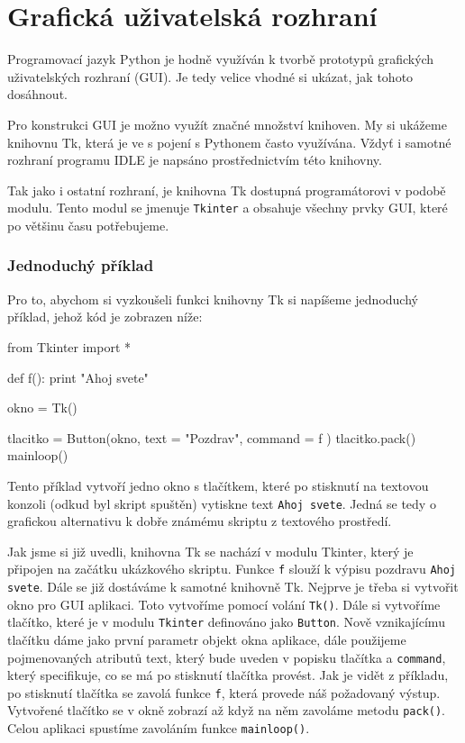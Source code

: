 \chapter{Grafická uživatelská rozhraní}
Programovací jazyk Python je hodně využíván k tvorbě prototypů grafických uživatelských rozhraní (GUI). Je tedy velice vhodné si ukázat, jak tohoto dosáhnout.

Pro konstrukci GUI je možno využít značné množství knihoven. My si ukážeme knihovnu Tk, která je ve s pojení s Pythonem často využívána. Vždyť i samotné rozhraní programu IDLE je napsáno prostřednictvím této knihovny.

Tak jako i ostatní rozhraní, je knihovna Tk dostupná programátorovi v podobě modulu. Tento modul se jmenuje \texttt{Tkinter} a obsahuje všechny prvky GUI, které po většinu času potřebujeme.

\subsection{Jednoduchý příklad}
Pro to, abychom si vyzkoušeli funkci knihovny Tk si napíšeme jednoduchý příklad, jehož kód je zobrazen níže:

\begin{python}
from Tkinter import *

def f():
    print "Ahoj svete"

okno = Tk()

tlacitko = Button(okno, text = "Pozdrav", command = f )
tlacitko.pack()
mainloop()
\end{python}

Tento příklad vytvoří jedno okno s tlačítkem, které po stisknutí na textovou konzoli (odkud byl skript spuštěn) vytiskne text \texttt{Ahoj svete}. Jedná se tedy o grafickou alternativu k dobře známému skriptu z textového prostředí.
 
Jak jsme si již uvedli, knihovna Tk se nachází v modulu Tkinter, který je připojen na začátku ukázkového skriptu. Funkce \texttt{f} slouží k výpisu po\-zdra\-vu \texttt{Ahoj svete}. Dále se již dostáváme k samotné knihovně Tk. Nejprve je třeba si vytvořit okno pro GUI aplikaci. Toto vytvoříme pomocí volání \texttt{Tk()}. Dále si vytvoříme tlačítko, které je v modulu \texttt{Tkinter} definováno jako \texttt{Button}. Nově vznikajícímu tlačítku dáme jako první parametr objekt okna aplikace, dále použijeme pojmenovaných atributů text, který bude uveden v popisku tlačítka a \texttt{command}, který specifikuje, co se má po stisknutí tlačítka provést. Jak je vidět z příkladu, po stisknutí tlačítka se zavolá funkce \texttt{f}, která provede náš požadovaný výstup. Vytvořené tlačítko se v okně zobrazí až když na něm zavoláme metodu \texttt{pack()}. Celou aplikaci spustíme zavoláním funkce \texttt{mainloop()}.

